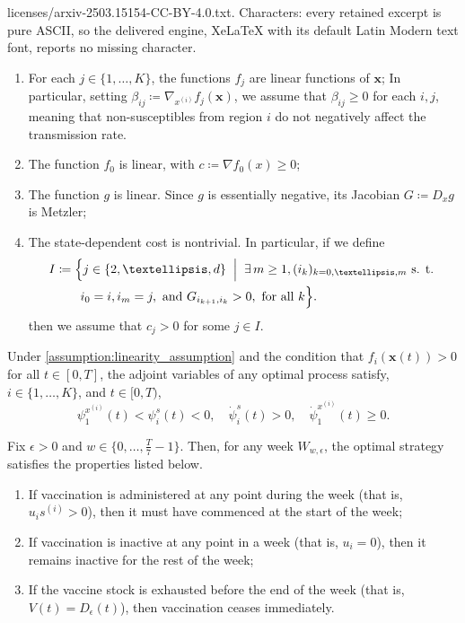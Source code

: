 \documentclass[10pt,a4paper]{amsart}
\newcommand{\fori}[1]{#1 \in \{1,\dots, K\}}
\begin{document}
licenses/arxiv-2503.15154-CC-BY-4.0.txt. Characters: every retained excerpt is pure ASCII, so the delivered engine, XeLaTeX with its default Latin Modern text font, reports no missing character.
\begin{assumption}
    \label{assumption:linearity_assumption}
    \begin{enumerate}
        \item[(a)]  For each $\fori{j}$, the functions $f_j$ are linear functions of $\boldsymbol{x}$;
        In particular, setting  $\beta_{ij} \coloneqq \nabla_{x^{(i)}} f_j(\boldsymbol{x})$, we assume that $\beta_{ij} \ge 0$ for each $i,j$, meaning that non-susceptibles from region $i$ do not negatively affect the transmission rate.
        \item[(b)] The function $f_0$ is linear, with $c \coloneqq \nabla f_0(x) \ge 0$;
        \item[(c)] The function $g$ is linear.
        Since $g$ is essentially negative, its Jacobian $G \coloneqq D_x g$ is Metzler;
        \item[(d)] The state-dependent cost is nontrivial. 
        In particular, if we define
        \[
        \begin{split}
            I &\coloneqq \Bigl\{ j \in \{2,\dots, d\} \;\Bigm|\; \exists\, m \ge1, (i_k)_{k=0,\dots,m} \text{ s. t. } \\ 
            &\quad\quad i_0=i, i_m=j,  \text{ and } G_{i_{k+1},i_k} > 0, \text{ for all } k\Bigr\}.
        \end{split}
        \]
        then we assume that \(c_j > 0\) for some \(j\in I\).
    \end{enumerate}
\end{assumption}

\begin{lemma}
    \label{lemma:shadow_price}
    Under \autoref{assumption:linearity_assumption} and the condition that $f_i(\boldsymbol{x}(t)) > 0$ for all $t \in [0,T]$, the adjoint variables of any optimal process satisfy, $\fori{i}$, and $t \in [0, T)$, 
    \[
    \psi^{x^{(i)}}_1(t) < \psi_i^s(t) <0 ,\quad \dot{\psi}_i^s(t) > 0,\quad \dot{\psi}_1^{x^{(i)}}(t) \ge 0.
    \]
\end{lemma}

\begin{theorem}\label{th:optimal_vaccination}
    Fix \(\epsilon>0\) and \(w\in\{0,\dots,\frac{T}{7}-1\}\).
    Then, for any week $W_{w,\epsilon}$, the optimal strategy satisfies the properties listed below.
    \begin{enumerate}
        \item If vaccination is administered at any point during the week (that is, $u_i s^{(i)} > 0$), then it must have commenced at the start of the week;
        \item If vaccination is inactive at any point in a week (that is, $u_i = 0$), then it remains inactive for the rest of the week;
        \item If the vaccine stock is exhausted before the end of the week (that is, \( V(t) = D_{\epsilon}(t) \)), then vaccination ceases immediately.
    \end{enumerate}
\end{theorem}
\end{document}

